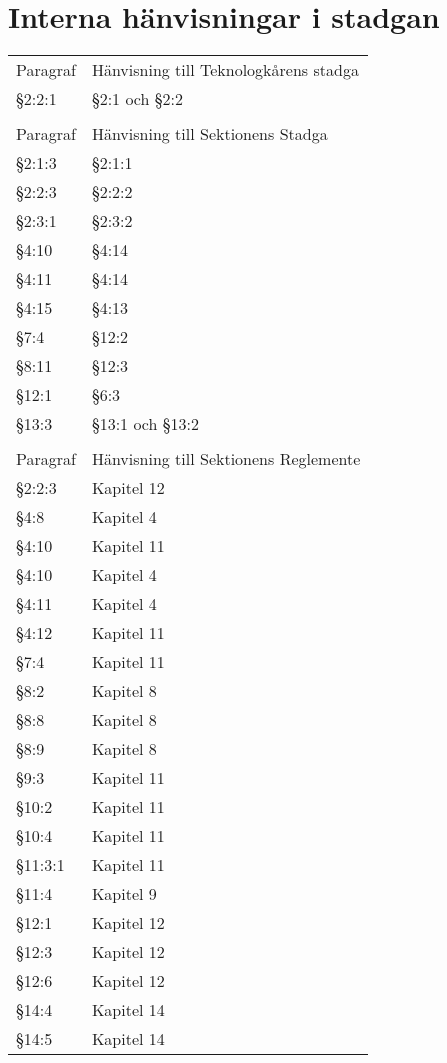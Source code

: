 \documentclass[10pt]{article}
\begin{document}
\section*{Interna hänvisningar i stadgan}
\renewcommand*\arraystretch{1}
\begin{tabular}{p{15mm} p{90mm}}
    Paragraf & Hänvisning till Teknologkårens stadga\\
    §2:2:1 & §2:1 och §2:2\\
    &\\
    Paragraf & Hänvisning till Sektionens Stadga\\
    §2:1:3 & §2:1:1\\
    §2:2:3 & §2:2:2\\
    §2:3:1 & §2:3:2\\
    §4:10 & §4:14\\
    §4:11 & §4:14\\
    §4:15 & §4:13\\
    §7:4 & §12:2\\
    §8:11 & §12:3\\
    §12:1 & §6:3\\
    §13:3 & §13:1 och §13:2\\
    &\\
    Paragraf & Hänvisning till Sektionens Reglemente\\
    §2:2:3 & Kapitel 12\\
    §4:8 & Kapitel 4\\
    §4:10 & Kapitel 11\\
    §4:10 & Kapitel 4\\
    §4:11 & Kapitel 4\\
    §4:12 & Kapitel 11\\
    §7:4 & Kapitel 11\\
    §8:2 & Kapitel 8\\
    §8:8 & Kapitel 8\\
    §8:9 & Kapitel 8\\
    §9:3 & Kapitel 11\\
    §10:2 & Kapitel 11\\
    §10:4 & Kapitel 11\\
    §11:3:1 & Kapitel 11\\
    §11:4 & Kapitel 9\\
    §12:1 & Kapitel 12\\
    §12:3 & Kapitel 12\\
    §12:6 & Kapitel 12\\
    §14:4 & Kapitel 14\\
    §14:5 & Kapitel 14\\
\end{tabular}
\renewcommand*\arraystretch{1.3}
\end{document}
